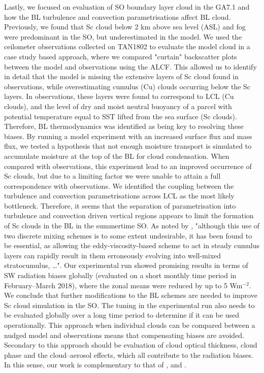 Lastly, we focused on evaluation of SO boundary layer cloud in the GA7.1
and how the BL turbulence and convection parametrisations affect
BL cloud. Previously, we found that Sc cloud below 2 km above sea level (ASL)
and fog were predominant in the SO, but underestimated in the model. We used
the ceilometer observations collected on TAN1802 to evaluate the model cloud
in a case study based approach, where we compared "curtain" backscatter plots
between the model and observations using the ALCF. This allowed us to identify
in detail that the model is missing the extensive layers of Sc cloud found
in observations, while overestimating cumulus (Cu) clouds occurring below the
Sc layers. In observations, these layers were found to correspond to LCL (Cu clouds),
and the level of dry and moist neutral buoyancy of a parcel with potential temperature
equal to SST lifted from the sea surface (Sc clouds). Therefore, BL
thermodynamics was identified as being key to resolving these biases. By running
a model experiment with an increased surface flux and mass flux, we tested
a hypothesis that not enough moisture transport is simulated to accumulate
moisture at the top of the BL for cloud condensation. When compared with
observations, this experiment lead to an improved occurrence of Sc clouds,
but due to a limiting factor we were unable to attain a full correspondence
with observations. We identified the coupling between the turbulence and convection
parametrisations across LCL as the most likely bottleneck. Therefore, it seems
that the separation of parametrisation into turbulence and convection driven
vertical regions appears to limit the formation of Sc clouds in the BL in the
summertime SO. As noted by \cite{lock2000}, "although this use of two discrete 
mixing schemes is to some extent undesirable, it has been found to be essential,
as allowing the eddy-viscosity-based scheme to act in steady
cumulus layers can rapidly result in them erroneously
evolving into well-mixed stratocumulus, \ldots".
Our experimental run showed promising results in terms of
SW radiation biases globally (evaluated on a short monthly time period in February--March 2018),
where the zonal means were reduced by up to 5 Wm$^{-2}$. We conclude that
further modifications to the BL schemes are needed to improve
Sc cloud simulation in the SO. The tuning in the experimental run also needs to
be evaluated globally over a long time period to determine if it can be used
operationally. This approach when individual clouds can be compared between
a nudged model and observations means that compensating biases are avoided.
Secondary to this approach should be evaluation of cloud optical thickness,
cloud phase and the cloud--aerosol effects, which all contribute to the
radiation biases. In this sense, our work is complementary to that of
\cite{revell2019}, \cite{hartery2020a} and \cite{hartery2020b}.

